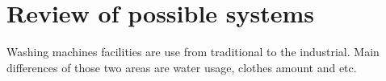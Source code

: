 \section{Review of possible systems}
Washing machines facilities are use from traditional to the industrial. Main differences of those two areas are water usage, clothes amount and etc.